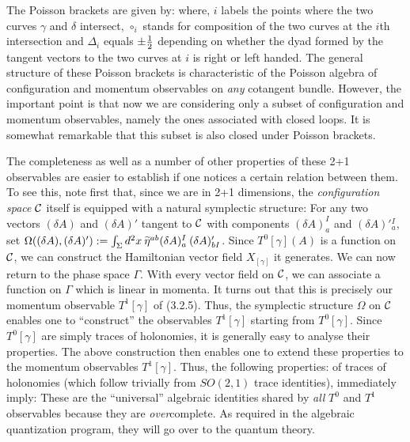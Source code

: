 \medskip
The Poisson brackets are given by:
%
where, $i$ labels the points where the two curves $\gamma$ and $\delta$
intersect, $\circ_i$ stands for composition of the two curves at the $i$th
intersection and $\Delta_i$ equals $\pm {1\over 2}$ depending on whether the
dyad formed by the tangent vectors to the two curves at $i$ is right or left
handed. The general structure of these Poisson brackets is characteristic of
the Poisson algebra of configuration and momentum observables on {\it any}
cotangent bundle. However, the important point is that now we are considering
only a subset of configuration and momentum observables, namely the ones
associated with closed loops. It is somewhat remarkable that this subset is
also closed under Poisson brackets.

The completeness as well as a number of other properties of these 2+1
observables are easier to establish if
one notices a certain relation between them. To see this, note first that,
since we are in 2+1 dimensions, the {\it configuration space} ${\cal C}$
itself is equipped with a natural symplectic structure: For any two vectors
$(\delta A)$ and $(\delta A)'$ tangent to ${\cal C}$ with components
$(\delta A)_a^I$ and $(\delta A)'{}_a^I$, set $\Omega ((\delta A),
(\delta A)' ) := \int\nolimits_\Sigma d^2x\> \widetilde\eta^{ab}(\delta A)_a^I\> (\delta
A)'_{bI}$. Since $T^0[\gamma ](A)$ is a function on ${\cal C}$, we can
construct the Hamiltonian vector field $X_{[\gamma ]}$ it generates. We can
now return to the phase space $\Gamma$. With every vector field on ${\cal C}$,
we can associate a function on $\Gamma$ which is linear in momenta. It turns
out that this is precisely our momentum observable $T^1[\gamma ]$ of
(3.2.5). Thus, the symplectic structure $\Omega$ on ${\cal C}$ enables one
to ``construct'' the observables $T^1[\gamma ]$ starting from $T^0[\gamma ]$.
Since $T^0[\gamma ]$ are simply traces of holonomies, it is generally easy to
analyse their properties. The above construction then enables one to extend
these properties to the momentum observables $T^1[\gamma ]$. Thus, the
following properties:
of traces of holonomies (which follow trivially from $SO(2,1)$ trace
identities), immediately imply:
These are the ``universal'' algebraic identities shared by {\it all}
$T^0$ and $T^1$ observables because they are {\it over}complete. As required
in the algebraic quantization program, they will go over to the quantum
theory.

